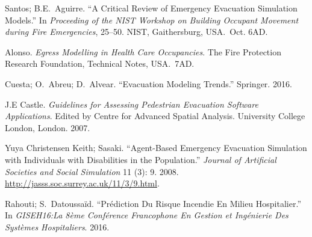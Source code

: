 \documentclass{style/llncs}
\begin{document}
{%
\begin{thebibliography}{36}%
\label{sec-bibliography}%

Santos; B.E.~Aguirre. \textquotedblleft{}A Critical Review of Emergency Evacuation Simulation Models.\textquotedblright{} In \emph{Proceeding of the NIST Workshop on Building Occupant Movement during Fire Emergencies}, 25–50. NIST, Gaithersburg, USA.~Oct. 6AD.\label{3}%

Alonso. \emph{Egress Modelling in Health Care Occupancies}. The Fire Protection Research Foundation, Technical Notes, USA.~7AD.\label{18}%

Cuesta; O.~Abreu; D.~Alvear. \textquotedblleft{}Evacuation Modeling Trends.\textquotedblright{} Springer. 2016.\label{13}%

J.E Castle. \emph{Guidelines for Assessing Pedestrian Evacuation Software Applications}. Edited by Centre for Advanced Spatial Analysis. University College London, London. 2007.\label{4}%

Yuya Christensen Keith; Sasaki. \textquotedblleft{}Agent-Based Emergency Evacuation Simulation with Individuals with Disabilities in the Population.\textquotedblright{} \emph{Journal of Artificial Societies and Social Simulation} 11 (3): 9. 2008. \href{http://jasss.soc.surrey.ac.uk/11/3/9.html}{{\ttfamily http://\hspace{0pt}jasss.\hspace{0pt}soc.\hspace{0pt}surrey.\hspace{0pt}ac.\hspace{0pt}uk/\hspace{0pt}11/\hspace{0pt}3/\hspace{0pt}9.\hspace{0pt}html}}.\label{8}%

Rahouti; S.~Datoussaïd. \textquotedblleft{}Prédiction Du Risque Incendie En Milieu Hospitalier.\textquotedblright{} In \emph{GISEH16:La 8ème Conférence Francophone En Gestion et Ingénierie Des Systèmes Hospitaliers}. 2016.\label{31}%


\end{thebibliography}}
\end{document}

